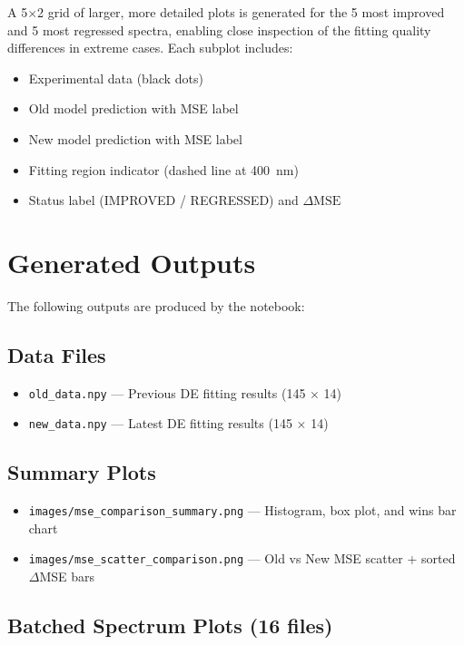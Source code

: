 \documentclass[12pt,a4paper]{article}
\begin{document}
A 5$\times$2 grid of larger, more detailed plots is generated for the 5 most improved and 5 most regressed spectra, enabling close inspection of the fitting quality differences in extreme cases. Each subplot includes:
\begin{itemize}[noitemsep]
    \item Experimental data (black dots)
    \item Old model prediction with MSE label
    \item New model prediction with MSE label
    \item Fitting region indicator (dashed line at 400~nm)
    \item Status label (IMPROVED / REGRESSED) and $\Delta\text{MSE}$
\end{itemize}

\section{Generated Outputs}

The following outputs are produced by the notebook:

\subsection*{Data Files}

\begin{itemize}[noitemsep]
    \item \texttt{old\_data.npy} --- Previous DE fitting results (145 $\times$ 14)
    \item \texttt{new\_data.npy} --- Latest DE fitting results (145 $\times$ 14)
\end{itemize}

\subsection*{Summary Plots}

\begin{itemize}[noitemsep]
    \item \texttt{images/mse\_comparison\_summary.png} --- Histogram, box plot, and wins bar chart
    \item \texttt{images/mse\_scatter\_comparison.png} --- Old vs New MSE scatter + sorted $\Delta$MSE bars
\end{itemize}

\subsection*{Batched Spectrum Plots (16 files)}
\end{document}
